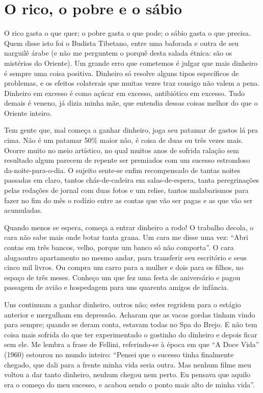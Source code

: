 \chapter{O rico, o pobre e o sábio}

O rico gasta o que quer; o pobre gasta o que pode; o sábio gasta o que
precisa. Quem disse isto foi o Budista Tibetano, entre uma baforada e
outra de seu narguilê árabe (e não me perguntem o porquê desta salada
étnica: são os mistérios do Oriente). Um grande erro que cometemos é
julgar que mais dinheiro é sempre uma coisa positiva.  Dinheiro só
resolve alguns tipos específicos de problemas, e os efeitos
colaterais que muitas vezes traz consigo não valem a pena. Dinheiro
em excesso é como açúcar em excesso, antibiótico em excesso. Tudo
demais é veneno, já dizia minha mãe, que entendia dessas coisas
melhor do que o Oriente inteiro.

Tem gente que, mal começa a ganhar dinheiro, joga seu patamar de
gastos lá pra cima. Não é um patamar 50\% maior não, é coisa de duas
ou três vezes mais.  Ocorre muito no meio artístico, no qual muitos
anos de sofrida ralação sem resultado algum parecem de repente ser
premiados com um sucesso estrondoso da-noite-para-o-dia. O sujeito
sente-se enfim recompensado de tantas noites passadas em claro,
tantos chás-de-cadeira em salas-de-espera, tanta peregrinações pelas
redações de jornal com duas fotos e um relise, tantos malabarismos
para fazer no fim do mês o rodízio entre as contas que vão ser pagas
e as que vão ser acumuladas.

Quando menos se espera, começa a entrar dinheiro a rodo! O trabalho
decola, o cara não sabe mais onde botar tanta grana. Um cara me disse
uma vez: “Abri contas em três bancos, velho, porque um banco só não
comporta”. O cara alugaoutro apartamento no mesmo andar, para
transferir seu escritório e seus cinco mil livros. Ou compra um carro
para a mulher e dois para os filhos, no espaço de três meses. Conheço
um que fez uma festa de aniversário e pagou passagem de avião e
hospedagem para uns quarenta amigos de infância.

Uns continuam a ganhar dinheiro, outros não; estes regridem para o
estágio anterior e mergulham em depressão. Acharam que as vacas
gordas tinham vindo para sempre; quando se deram conta, estavam todas
no Spa do Brejo. E não tem coisa mais sofrida do que ter
experimentado o gostinho do dinheiro e depois ficar sem ele. Me
lembra a frase de Fellini, referindo-se à época em que “A Doce Vida”
(1960) estourou no mundo inteiro: “Pensei que o sucesso tinha
finalmente chegado, que dali para a frente minha vida seria outra.
Mas nenhum filme meu voltou a dar tanto dinheiro, nenhum chegou nem
perto. Eu pensava que aquilo era o começo do meu sucesso, e acabou
sendo o ponto mais alto de minha vida”.

